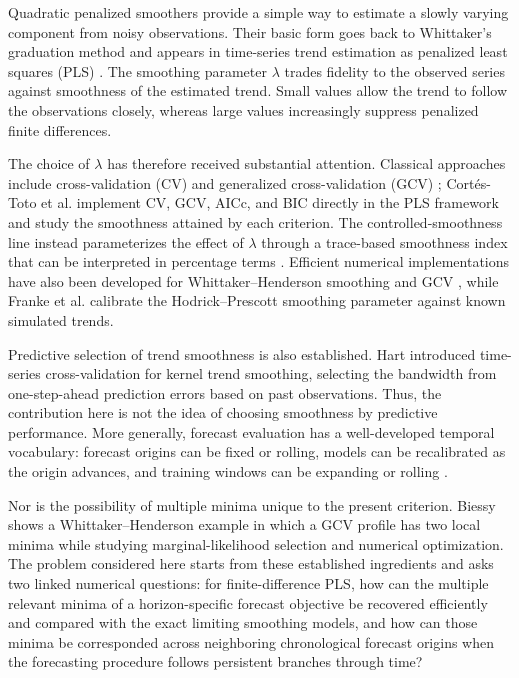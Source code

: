 \documentclass[english]{smcca}
\begin{document}
Quadratic penalized smoothers provide a simple way to estimate a slowly varying component from noisy observations. Their basic form goes back to Whittaker's graduation method \cite{whittaker1923graduation} and appears in time-series trend estimation as penalized least squares (PLS) \cite{guerrero2007penalized}. The smoothing parameter \(\lambda\) trades fidelity to the observed series against smoothness of the estimated trend. Small values allow the trend to follow the observations closely, whereas large values increasingly suppress penalized finite differences.

The choice of \(\lambda\) has therefore received substantial attention. Classical approaches include cross-validation (CV) and generalized cross-validation (GCV) \cite{craven1979gcv}; Cortés-Toto et al. \cite{cortes2017smoothness} implement CV, GCV, AICc, and BIC directly in the PLS framework and study the smoothness attained by each criterion. The controlled-smoothness line instead parameterizes the effect of \(\lambda\) through a trace-based smoothness index that can be interpreted in percentage terms \cite{guerrero2008smoothness,cortes2017smoothness}. Efficient numerical implementations have also been developed for Whittaker--Henderson smoothing and GCV \cite{weinert2007wh}, while Franke et al. \cite{franke2026hp} calibrate the Hodrick--Prescott smoothing parameter against known simulated trends.

Predictive selection of trend smoothness is also established. Hart \cite{hart1994tscv} introduced time-series cross-validation for kernel trend smoothing, selecting the bandwidth from one-step-ahead prediction errors based on past observations. Thus, the contribution here is not the idea of choosing smoothness by predictive performance. More generally, forecast evaluation has a well-developed temporal vocabulary: forecast origins can be fixed or rolling, models can be recalibrated as the origin advances, and training windows can be expanding or rolling \cite{tashman2000oos,bergmeir2012cv}.

Nor is the possibility of multiple minima unique to the present criterion. Biessy \cite{biessy2026wh} shows a Whittaker--Henderson example in which a GCV profile has two local minima while studying marginal-likelihood selection and numerical optimization. The problem considered here starts from these established ingredients and asks two linked numerical questions: for finite-difference PLS, how can the multiple relevant minima of a horizon-specific forecast objective be recovered efficiently and compared with the exact limiting smoothing models, and how can those minima be corresponded across neighboring chronological forecast origins when the forecasting procedure follows persistent branches through time?
\end{document}

